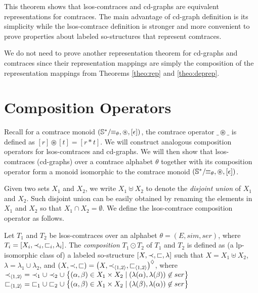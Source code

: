 \documentclass{llncs}
\begin{document}
This theorem shows that lsos-comtraces and cd-graphs are equivalent representations for comtraces.  The main advantage of cd-graph definition is its simplicity while the lsos-comtrace definition is stronger and more convenient to prove properties about labeled so-structures that represent comtraces. 

We do not need to prove another representation theorem for cd-graphs and comtraces since their representation mappings are simply the composition of the representation mappings from Theorems \ref{theo:rep} and \ref{theo:deprep}.

\section{Composition Operators}
Recall for a comtrace monoid $(\mathbb{S}^*/\!\!\equiv_{\theta},\circledast,[\epsilon])$, the comtrace operator $\_\circledast\_$ is defined as $[r]\circledast[t] = [r\ast t]$. We will construct analogous composition operators for lsos-comtraces and cd-graphs. We will then show that lsos-comtraces (cd-graphs) over a comtrace alphabet $\theta$ together with its composition operator form a monoid isomorphic to the comtrace monoid $(\mathbb{S}^*/\!\!\equiv_{\theta},\circledast,[\epsilon])$.

Given two sets $X_{1}$ and $X_{2}$, we  write $X_{1}\uplus X_{2}$ to denote the \emph{disjoint union} of $X_{1}$ and $X_{2}$. Such disjoint union can be easily obtained by renaming the elements in $X_{1}$ and $X_{2}$ so that $X_{1}\cap X_{2} =\emptyset$. We define the lsos-comtrace composition operator as follows.


\begin{definition} Let $T_{1}$ and $T_{2}$ be lsos-comtraces over an alphabet $\theta=(E,sim,ser)$, where $T_{i}=\left[ X_{i},\prec_{i},\sqsubset_{i},\lambda_{i} \right]$. The \emph{composition} $T_{1}\odot T_{2}$ of $T_{1}$ and $T_{2}$ is defined as (a lp-isomorphic class of) a labeled so-structure $\left[ X,\prec,\sqsubset,\lambda \right]$ such that $X=X_{1}\uplus X_{2}$, $\lambda = \lambda_{1}\cup \lambda_{2}$, and $(X,\prec,\sqsubset) = \left(X,\prec_{\langle1,2\rangle},\sqsubset_{\langle1,2\rangle}\right)^{\lozenge}$, where\smallskip\\
\mbox{\hspace{1.5cm}}$\prec_{\langle1,2\rangle}\;=\; \prec_{1}\cup \prec_{2}\cup\; \bigl\{(\alpha,\beta)\in X_{1}\times X_{2}\mid (\lambda(\alpha),\lambda(\beta))\not\in ser\bigr\}$\\
\mbox{\hspace{1.5cm}}$\sqsubset_{\langle1,2\rangle}\; =\; \sqsubset_{1}\cup \sqsubset_{2}\cup\; \bigl\{(\alpha,\beta)\in X_{1}\times X_{2}\mid (\lambda(\beta),\lambda(\alpha))\not\in ser\bigr\}$ \EOD
\end{definition}
\end{document}
